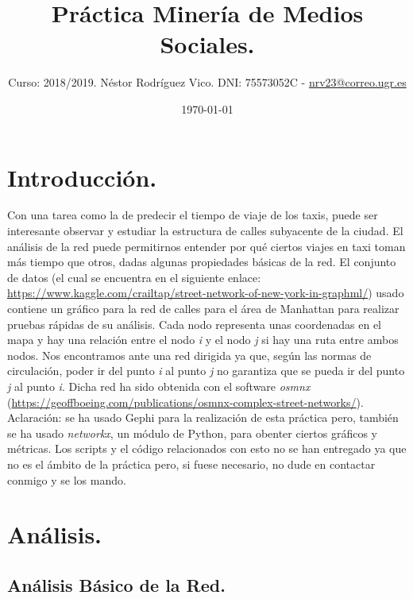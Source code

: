 \documentclass[11pt]{article}
\title{Práctica Minería de Medios Sociales.}
\author{Curso: 2018/2019. Néstor Rodríguez Vico. DNI: 75573052C - \href{mailto:nrv23@correo.ugr.es}{nrv23@correo.ugr.es}}
\date{\today}
\begin{document}
\maketitle

\setlength{\belowdisplayskip}{5pt} 
\setlength{\belowdisplayshortskip}{5pt}
\setlength{\abovedisplayskip}{5pt} 
\setlength{\abovedisplayshortskip}{5pt}

\section{Introducción.}

Con una tarea como la de predecir el tiempo de viaje de los taxis, puede ser interesante observar y estudiar la estructura de calles subyacente de la ciudad. El análisis de la red puede permitirnos entender por qué ciertos viajes en taxi toman más tiempo que otros, dadas algunas propiedades básicas de la red. El conjunto de datos (el cual se encuentra en el siguiente enlace: \href{https://www.kaggle.com/crailtap/street-network-of-new-york-in-graphml/}{https://www.kaggle.com/crailtap/street-network-of-new-york-in-graphml/}) usado contiene un gráfico para la red de calles para el área de Manhattan para realizar pruebas rápidas de su análisis. Cada nodo representa unas coordenadas en el mapa y hay una relación entre el nodo \textit{i} y el nodo \textit{j} si hay una ruta entre ambos nodos. Nos encontramos ante una red dirigida ya que, según las normas de circulación, poder ir del punto \textit{i} al punto \textit{j} no garantiza que se pueda ir del punto \textit{j} al punto \textit{i}. Dicha red ha sido obtenida con el software \textit{osmnx} (\href{https://geoffboeing.com/publications/osmnx-complex-street-networks/}{https://geoffboeing.com/publications/osmnx-complex-street-networks/}). \\

Aclaración: se ha usado Gephi para la realización de esta práctica pero, también se ha usado \textit{networkx}, un módulo de Python, para obenter ciertos gráficos y métricas. Los scripts y el código relacionados con esto no se han entregado ya que no es el ámbito de la práctica pero, si fuese necesario, no dude en contactar conmigo y se los mando.

\section{Análisis.}

\subsection{Análisis Básico de la Red.}
\end{document}
